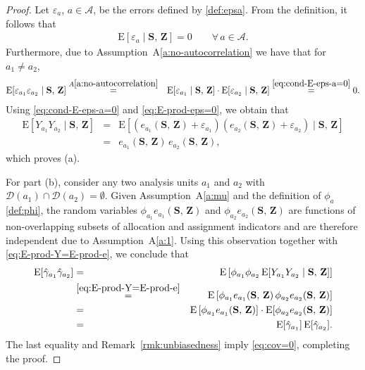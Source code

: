 \documentclass[sigconf,nonacm]{acmart}
\newcommand{\E}{\mathrm E}
\begin{document}
\begin{proof}
    Let $\varepsilon_a$, $a\in\mathcal{A}$, be the errors defined by \eqref{def:epsa}. From the definition, it follows that
    \begin{eqnarray}\label{eq:cond-E-eps-a=0}
        \E[\varepsilon_a\mid \mathbf{S},\,\mathbf{Z}] = 0\qquad\forall\,a\in\mathcal A.
    \end{eqnarray}
    Furthermore, due to Assumption~A\ref{a:no-autocorrelation} we have that for $a_1\neq a_2$,
    \begin{eqnarray}\label{eq:E-prod-eps=0}
        \E[\varepsilon_{a_1}\varepsilon_{a_2}\mid \mathbf{S},\,\mathbf{Z}]
        &\stackrel{A\ref{a:no-autocorrelation}}{=}& \E[\varepsilon_{a_1}\mid \mathbf{S},\,\mathbf{Z}]\cdot
        \E[\varepsilon_{a_2}\mid \mathbf{S},\,\mathbf{Z}]
        \stackrel{\eqref{eq:cond-E-eps-a=0}}{=} 0.
    \end{eqnarray}
    Using \eqref{eq:cond-E-eps-a=0} and \eqref{eq:E-prod-eps=0}, we obtain that
    \begin{eqnarray}\label{eq:E-prod-Y=E-prod-e}
        \E[Y_{a_1}Y_{a_2}\mid \mathbf{S},\,\mathbf{Z}] &=& \E[
        (e_{a_1}(\mathbf{S},\,\mathbf{Z}) + \varepsilon_{a_1})
        (e_{a_2}(\mathbf{S},\,\mathbf{Z}) + \varepsilon_{a_2})\mid \mathbf{S},\,\mathbf{Z}
        ]\nonumber\\
        &=& e_{a_1}(\mathbf{S},\,\mathbf{Z})\,e_{a_2}(\mathbf{S},\,\mathbf{Z}),
    \end{eqnarray}
    which proves (a).

    For part (b), consider any two analysis units $a_1$ and $a_2$ with $\mathcal{D}(a_1)\cap \mathcal{D}(a_2)=\emptyset$. Given Assumption~A\ref{a:mu} and the definition of $\phi_a$ \eqref{def:phi}, the random variables $\phi_{a_1} e_{a_1}(\mathbf{S},\,\mathbf{Z})$ and $\phi_{a_2}e_{a_2}(\mathbf{S},\,\mathbf{Z})$ are functions of non-overlapping subsets of allocation and assignment indicators and are therefore independent due to Assumption~A\ref{a:1}. Using this observation together with \eqref{eq:E-prod-Y=E-prod-e}, we conclude that
    \begin{eqnarray}\label{eq:=0}
        \E[\hat\gamma_{a_1}\hat\gamma_{a_2}]
        &=& \E\left[\phi_{a_1}\phi_{a_2}\,\E[Y_{a_1}Y_{a_2}\mid \mathbf{S},\,\mathbf{Z}]\right]
        \nonumber\\
        &\stackrel{\eqref{eq:E-prod-Y=E-prod-e}}{=}& \E\left[\phi_{a_1}e_{a_1}(\mathbf{S},\,\mathbf{Z})\,\phi_{a_2}e_{a_2}(\mathbf{S},\,\mathbf{Z})\right]\nonumber\\
        &=& \E\left[\phi_{a_1}e_{a_1}(\mathbf{S},\,\mathbf{Z})\right]\cdot\E[\phi_{a_2}e_{a_2}(\mathbf{S},\,\mathbf{Z})] \nonumber\\
        &=& \E[\hat\gamma_{a_1}]\,\E[\hat\gamma_{a_2}].
    \end{eqnarray}
    The last equality and Remark~\ref{rmk:unbiasedness} imply \eqref{eq:cov=0}, completing the proof.
\end{proof}
\end{document}
